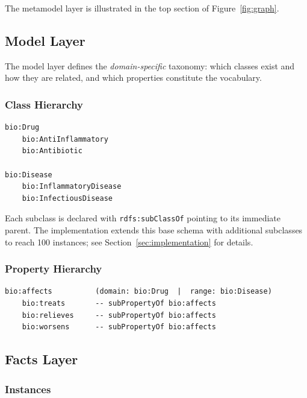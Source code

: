 \documentclass[11pt,a4paper]{article}
\begin{document}
The metamodel layer is illustrated in the top section of Figure~\ref{fig:graph}.

\subsection{Model Layer}

The model layer defines the \emph{domain-specific} taxonomy: which classes
exist and how they are related, and which properties constitute the vocabulary.

\subsubsection*{Class Hierarchy}

\begin{verbatim}
bio:Drug
    bio:AntiInflammatory
    bio:Antibiotic

bio:Disease
    bio:InflammatoryDisease
    bio:InfectiousDisease
\end{verbatim}

Each subclass is declared with \texttt{rdfs:subClassOf} pointing to its
immediate parent.  The implementation extends this base schema with additional
subclasses to reach 100 instances; see Section~\ref{sec:implementation} for
details.

\subsubsection*{Property Hierarchy}

\begin{verbatim}
bio:affects          (domain: bio:Drug  |  range: bio:Disease)
    bio:treats       -- subPropertyOf bio:affects
    bio:relieves     -- subPropertyOf bio:affects
    bio:worsens      -- subPropertyOf bio:affects
\end{verbatim}



\subsection{Facts Layer}

\subsubsection*{Instances}
\end{document}
